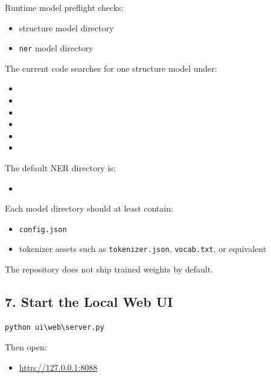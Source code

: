 \documentclass[11pt,a4paper]{ctexart}
\begin{document}
Runtime model preflight checks:

\begin{itemize}
\item structure model directory
\item \texttt{ner} model directory
\end{itemize}

The current code searches for one structure model under:

\begin{itemize}
\item {}
\item {}
\item {}
\item {}
\item {}
\item {}
\end{itemize}

The default NER directory is:

\begin{itemize}
\item {}
\end{itemize}

Each model directory should at least contain:

\begin{itemize}
\item \texttt{config.json}
\item tokenizer assets such as \texttt{tokenizer.json}, \texttt{vocab.txt}, or equivalent
\end{itemize}

The repository does not ship trained weights by default.

\subsection*{7. Start the Local Web UI}

\begin{verbatim}
python ui\web\server.py
\end{verbatim}

Then open:

\begin{itemize}
\item \url{http://127.0.0.1:8088}
\end{itemize}
\end{document}
